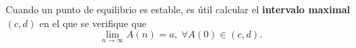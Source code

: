 \begin{observation}
\normalfont Cuando un punto de equilibrio es estable, es útil calcular el \textbf{intervalo maximal} $\displaystyle \left(c,d\right) $ en el que se verifique que
\[\lim_{n \to \infty}A\left(n\right) = a, \; \forall A\left(0\right) \in \left(c,d\right) .\]
\end{observation}


